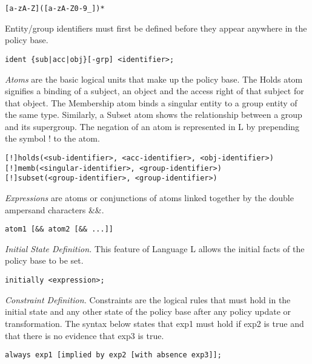 \documentclass{llncs}
\begin{document}
      \begin{verbatim}[a-zA-Z]([a-zA-Z0-9_])*\end{verbatim}

      Entity/group identifiers must first be defined before they appear
      anywhere in the policy base.

      \begin{verbatim}ident {sub|acc|obj}[-grp] <identifier>;\end{verbatim}

      \emph{Atoms} are the basic logical units that make up the policy base.
      The Holds atom signifies a binding of a subject, an object and the
      access right of that subject for that object. The Membership atom binds
      a singular entity to a group entity of the same type. Similarly, a Subset
      atom shows the relationship between a group and its supergroup. The
      negation of an atom is represented in L by prepending the symbol ! to the
      atom.

      \begin{verbatim}[!]holds(<sub-identifier>, <acc-identifier>, <obj-identifier>)
[!]memb(<singular-identifier>, <group-identifier>)
[!]subset(<group-identifier>, <group-identifier>)\end{verbatim}

      \emph{Expressions} are atoms or conjunctions of atoms linked together by
      the double ampersand characters \&\&.

      \begin{verbatim}atom1 [&& atom2 [&& ...]]\end{verbatim}

      \emph{Initial State Definition.} This feature of Language L allows the
      initial facts of the policy base to be set.

      \begin{verbatim}initially <expression>;\end{verbatim}

      \emph{Constraint Definition.} Constraints are the logical rules that must
      hold in the initial state and any other state of the policy base after
      any policy update or transformation. The syntax below states that exp1
      must hold if exp2 is true and that there is no evidence that exp3 is
      true.

      \begin{verbatim}always exp1 [implied by exp2 [with absence exp3]];\end{verbatim}
\end{document}
